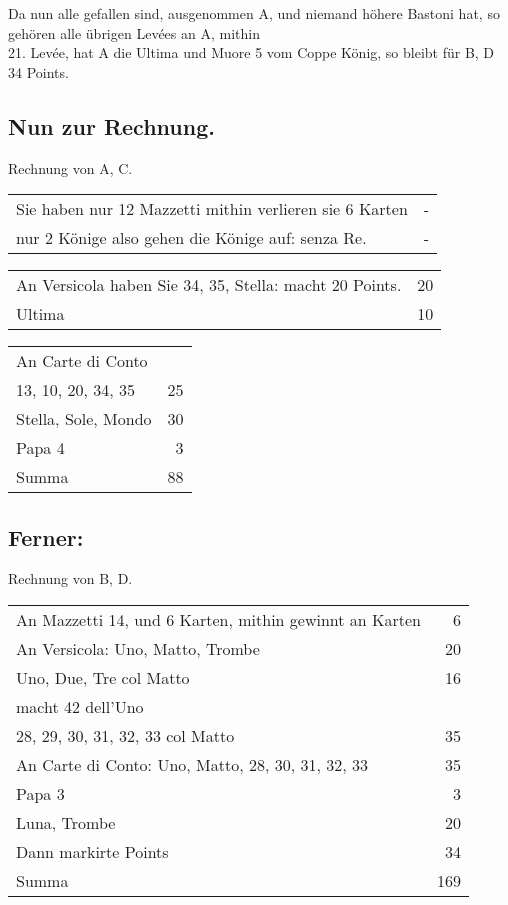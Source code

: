 \documentclass[11pt,a6paper,twoside]{article}
\begin{document}
\noindent Da nun alle gefallen sind, ausgenommen A, und niemand höhere Bastoni hat, so gehören alle übrigen Levées an A, mithin\\
21. Levée, hat A die Ultima und Muore 5 vom Coppe König, so bleibt für B, D 34 Points.

\subsection{Nun zur Rechnung.}

Rechnung von A, C.\\
\begin{tabular}{@{}b{6.5cm}@{\hspace{2em}}r}
Sie haben nur 12 Mazzetti mithin verlieren sie 6 Karten&-\\
nur 2 Könige also gehen die Könige auf: senza Re.&-\\
\end{tabular}
\begin{tabular}{@{}b{6.5cm}r}
An Versicola haben Sie
34, 35, Stella: macht 20 Points.& 20\\
Ultima& 10\\
\end{tabular}
\begin{tabular}{@{}b{6.5cm}r}
An Carte di Conto\\
13, 10, 20, 34, 35& 25\\
Stella, Sole, Mondo & 30\\
Papa 4 &3 \\
Summa &88
\end{tabular}

\subsection{Ferner:}

Rechnung von B, D.\\
\begin{tabular}{@{}b{6.5cm}r}
An Mazzetti 14, und 6 Karten,
mithin gewinnt an Karten & 6\\
An Versicola:
Uno, Matto, Trombe& 20\\
Uno, Due, Tre col Matto& 16\\
macht 42 dell'Uno\\
28, 29, 30, 31, 32, 33 col Matto& 35\\
An Carte di Conto:
Uno, Matto, 28, 30, 31, 32, 33& 35\\
Papa 3& 3\\
Luna, Trombe& 20\\
Dann markirte Points& 34\\
Summa& 169
\end{tabular}
\end{document}
